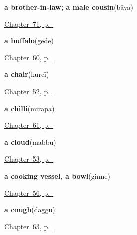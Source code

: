 \noindent\begin{minipage}[t]{\linewidth}
\raggedright
\textbf{a brother-in-law; a male cousin}\enspace\emph{}\enspace(bāva)\par
\footnotesize \hyperref[ch:te-the-wider-family]{Chapter~71, p.~\pageref*{ch:te-the-wider-family}}
\end{minipage}\par\smallskip

\noindent\begin{minipage}[t]{\linewidth}
\raggedright
\textbf{a buffalo}\enspace\emph{}\enspace(gēde)\par
\footnotesize \hyperref[ch:te-animals]{Chapter~60, p.~\pageref*{ch:te-animals}}
\end{minipage}\par\smallskip

\noindent\begin{minipage}[t]{\linewidth}
\raggedright
\textbf{a chair}\enspace\emph{}\enspace(kurcī)\par
\footnotesize \hyperref[ch:te-welcome]{Chapter~52, p.~\pageref*{ch:te-welcome}}
\end{minipage}\par\smallskip

\noindent\begin{minipage}[t]{\linewidth}
\raggedright
\textbf{a chilli}\enspace\emph{}\enspace(mirapa)\par
\footnotesize \hyperref[ch:te-kitchen]{Chapter~61, p.~\pageref*{ch:te-kitchen}}
\end{minipage}\par\smallskip

\noindent\begin{minipage}[t]{\linewidth}
\raggedright
\textbf{a cloud}\enspace\emph{}\enspace(mabbu)\par
\footnotesize \hyperref[ch:te-sky]{Chapter~53, p.~\pageref*{ch:te-sky}}
\end{minipage}\par\smallskip

\noindent\begin{minipage}[t]{\linewidth}
\raggedright
\textbf{a cooking vessel, a bowl}\enspace\emph{}\enspace(ginne)\par
\footnotesize \hyperref[ch:te-house]{Chapter~56, p.~\pageref*{ch:te-house}}
\end{minipage}\par\smallskip

\noindent\begin{minipage}[t]{\linewidth}
\raggedright
\textbf{a cough}\enspace\emph{}\enspace(daggu)\par
\footnotesize \hyperref[ch:te-health]{Chapter~63, p.~\pageref*{ch:te-health}}
\end{minipage}\par\smallskip


